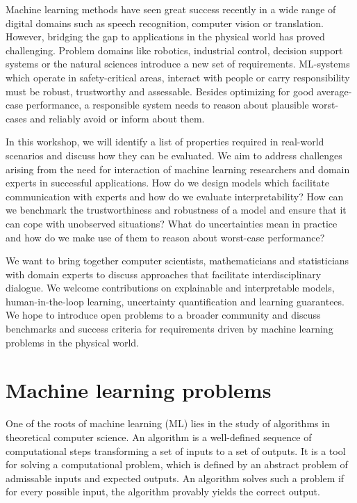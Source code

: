 Machine learning methods have seen great success recently in a wide range of digital domains such as speech recognition, computer vision or translation.
However, bridging the gap to applications in the physical world has proved challenging.
Problem domains like robotics, industrial control, decision support systems or the natural sciences introduce a new set of requirements.
ML-systems which operate in safety-critical areas, interact with people or carry responsibility must be robust, trustworthy and assessable.
Besides optimizing for good average-case performance, a responsible system needs to reason about plausible worst-cases and reliably avoid or inform about them.

In this workshop, we will identify a list of properties required in real-world scenarios and discuss how they can be evaluated.
We aim to address challenges arising from the need for interaction of machine learning researchers and domain experts in successful applications.
How do we design models which facilitate communication with experts and how do we evaluate interpretability?
How can we benchmark the trustworthiness and robustness of a model and ensure that it can cope with unobserved situations?
What do uncertainties mean in practice and how do we make use of them to reason about worst-case performance?

We want to bring together computer scientists, mathematicians and statisticians with domain experts to discuss approaches that facilitate interdisciplinary dialogue.
We welcome contributions on explainable and interpretable models, human-in-the-loop learning, uncertainty quantification and learning guarantees.
We hope to introduce open problems to a broader community and discuss benchmarks and success criteria for requirements driven by machine learning problems in the physical world.

\section{Machine learning problems}

One of the roots of machine learning (ML) lies in the study of algorithms in theoretical computer science.
An algorithm is a well-defined sequence of computational steps transforming a set of inputs to a set of outputs.
It is a tool for solving a computational problem, which is defined by an abstract problem of admissable inputs and expected outputs.
An algorithm solves such a problem if for every possible input, the algorithm provably yields the correct output.

